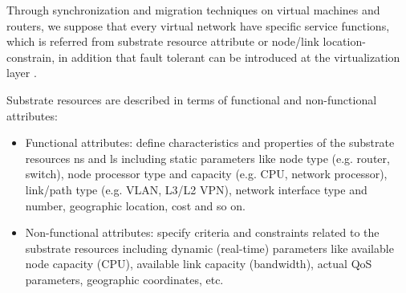 Through synchronization \cite{bressoud1996hypervisor,cully2008remus} and migration techniques \cite{clark2005live,wang2008virtual} on virtual machines and routers, we suppose that every virtual network have specific service functions\cite{houidi2009virtual}, which is referred from substrate resource attribute or node/link location-constrain, in addition that fault tolerant can be introduced at the virtualization layer \cite{yeow2011designing,qu2016delay}.



Substrate resources are described in terms of functional and non-functional
attributes:
\begin{itemize}
  \item Functional attributes: define characteristics and properties of the substrate resources ns and ls including static parameters like node type (e.g. router, switch), node processor type and capacity (e.g. CPU, network processor), link/path type (e.g. VLAN, L3/L2 VPN), network interface type and number, geographic location, cost and so on.
  \item Non-functional attributes: specify criteria and constraints related to the substrate resources including dynamic (real-time) parameters like available node capacity (CPU), available link capacity (bandwidth), actual QoS parameters, geographic coordinates, etc.
\end{itemize}





%

